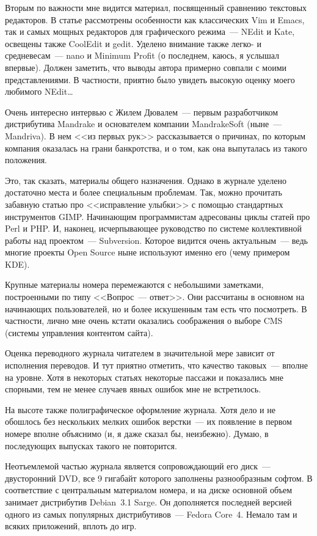 Вторым по важности мне видится материал, посвященный сравнению текстовых редакторов. В статье рассмотрены особенности как классических Vim и Emacs, так и самых мощных редакторов для графического режима~--- NEdit и Kate, освещены также CoolEdit и gedit. Уделено внимание также легко- и средневесам~--- nano и Minimum Profit (о последнем, каюсь, я услышал впервые). Должен заметить, что выводы автора примерно совпали с моими представлениями. В частности, приятно было увидеть высокую оценку моего любимого NEdit\dots

Очень интересно интервью с Жилем Дювалем~--- первым разработчиком дистрибутива Mandrake и основателем компании MandrakeSoft (ныне~--- Mandriva). В нем <<из первых рук>> рассказывается о причинах, по которым компания оказалась на грани банкротства, и о том, как она выпуталась из такого положения.

Это, так сказать, материалы общего назначения. Однако в журнале уделено достаточно места и более специальным проблемам. Так, можно прочитать забавную статью про <<исправление улыбки>> с помощью стандартных инструментов GIMP. Начинающим программистам адресованы циклы статей про Perl и PHP. И, наконец, исчерпывающее руководство по системе коллективной работы над проектом~--- Subversion. Которое видится очень актуальным~--- ведь многие проекты Open Source ныне используют именно его (чему примером KDE).

Крупные материалы номера перемежаются с небольшими заметками, построенными по типу <<Вопрос~--- ответ>>. Они рассчитаны в основном на начинающих пользователей, но и более искушенным там есть что посмотреть. В частности, лично мне очень кстати оказались соображения о выборе CMS (системы управления контентом сайта).

Оценка переводного журнала читателем в значительной мере зависит от исполнения переводов. И тут приятно отметить, что качество таковых~--- вполне на уровне. Хотя в некоторых статьях некоторые пассажи и показались мне спорными, тем не менее случаев явных ошибок мне не встретилось.

На высоте также полиграфическое оформление журнала. Хотя дело и не обошлось без нескольких мелких ошибок верстки~--- их появление в первом номере вполне объяснимо (и, я даже сказал бы, неизбежно). Думаю, в последующих выпусках такого не повторится.

Неотъемлемой частью журнала является сопровождающий его диск~--- двусторонний DVD, все 9 гигабайт которого заполнены разнообразным софтом. В соответствие с центральным материалом номера, и на диске основной объем занимает дистрибутив Debian~3.1 Sarge. Он дополняется последней версией одного из самых популярных дистрибутивов~--- Fedora Core~4. Немало там и всяких приложений, вплоть до игр.

